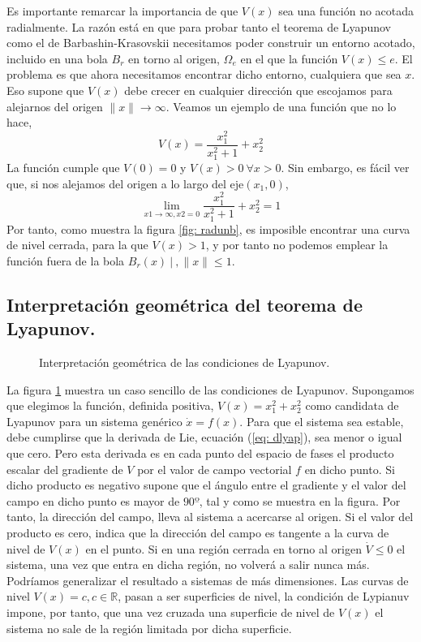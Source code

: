 Es importante remarcar la importancia de que $V(x)$ sea una función no acotada radialmente. La razón está en que para probar tanto el teorema de Lyapunov como el de Barbashin-Krasovskii necesitamos poder construir un entorno acotado, incluido en una bola $B_r$ en torno al origen, $\Omega_e$ en el que la función $V(x) \leq e$. El problema es que ahora necesitamos encontrar dicho entorno, cualquiera que sea $x$. Eso supone que $V(x)$ debe crecer en cualquier dirección que escojamos para alejarnos del origen $\|x\| \to \infty$. Veamos un ejemplo de una  función que no lo hace, 
\begin{equation*}
V(x) = \frac{x_1^2}{x_1^2+1}+x_2^2
\end{equation*}
 La función cumple que $V(0) = 0$ y $V(x) >0\ \forall x>0$. Sin embargo, es fácil ver que, si nos alejamos del origen a lo largo del eje$(x_1,0)$,
 \begin{equation}
 \lim_{x1\to\infty,x2=0} \frac{x_1^2}{x_1^2+1}+x_2^2 = 1
 \end{equation}
 Por tanto, como muestra la figura \ref{fig: radunb}, es imposible encontrar una curva de nivel cerrada, para la que $V(x) >1$, y por tanto no podemos emplear la función fuera de la bola $B_r(x)\ \vert\ , \|x\| \leq 1$.
 
\subsection{Interpretación geométrica del teorema de Lyapunov.}
\begin{figure}
\caption{Interpretación geométrica de las condiciones de Lyapunov.}
\label{fig: lyap}
\end{figure}
 La figura \ref{fig: lyap} muestra un caso sencillo de las condiciones de Lyapunov. Supongamos que elegimos la función, definida positiva,  $V(x) = x_1^2 + x_2^2$ como candidata de Lyapunov para un sistema genérico $\dot x = f(x)$.  Para que el sistema sea estable, debe cumplirse que la derivada de Lie, ecuación  (\ref{eq: dlyap}), sea menor o igual que cero.  Pero esta derivada es en cada punto del espacio de fases el producto escalar del gradiente de $V$ por el valor de campo vectorial $f$ en dicho punto. Si dicho producto es negativo supone que el ángulo entre el gradiente y el valor del campo en dicho punto es mayor de $90º$, tal y como se muestra en la figura. Por tanto, la dirección del campo, lleva al sistema a acercarse al origen. Si el valor del producto es cero, indica que la dirección del campo es tangente a la curva de nivel de  $V(x)$ en el punto. Si en una región cerrada en torno al origen $\dot V \leq 0$ el sistema, una vez que entra en dicha región, no volverá a salir nunca más.
 Podríamos generalizar el resultado a sistemas de más dimensiones. Las curvas de nivel  $V(x)=c, c \in \mathbb{R} $, pasan a ser superficies de nivel, la condición de Lypianuv impone, por tanto, que una vez cruzada una superficie de nivel de $V(x)$ el sistema no sale de la región limitada por dicha superficie.
 
